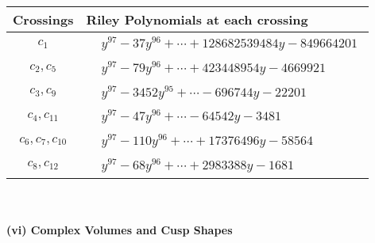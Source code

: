 \documentclass[1p]{elsarticle_modified}
\theoremstyle{definition}
\begin{document}
\begin{tabular}{m{50pt}|m{274pt}}
Crossings & \hspace{64pt}Riley Polynomials at each crossing \\
\hline $$\begin{aligned}c_{1}\end{aligned}$$&$\begin{aligned}
&y^{97}-37 y^{96}+\cdots+128682539484 y-849664201
\end{aligned}$\\
\hline $$\begin{aligned}c_{2},c_{5}\end{aligned}$$&$\begin{aligned}
&y^{97}-79 y^{96}+\cdots+423448954 y-4669921
\end{aligned}$\\
\hline $$\begin{aligned}c_{3},c_{9}\end{aligned}$$&$\begin{aligned}
&y^{97}-3452 y^{95}+\cdots-696744 y-22201
\end{aligned}$\\
\hline $$\begin{aligned}c_{4},c_{11}\end{aligned}$$&$\begin{aligned}
&y^{97}-47 y^{96}+\cdots-64542 y-3481
\end{aligned}$\\
\hline $$\begin{aligned}c_{6},c_{7},c_{10}\end{aligned}$$&$\begin{aligned}
&y^{97}-110 y^{96}+\cdots+17376496 y-58564
\end{aligned}$\\
\hline $$\begin{aligned}c_{8},c_{12}\end{aligned}$$&$\begin{aligned}
&y^{97}-68 y^{96}+\cdots+2983388 y-1681
\end{aligned}$\\
\hline
\end{tabular}\\~\\
\newpage\flushleft \textbf{(vi) Complex Volumes and Cusp Shapes}
\end{document}
